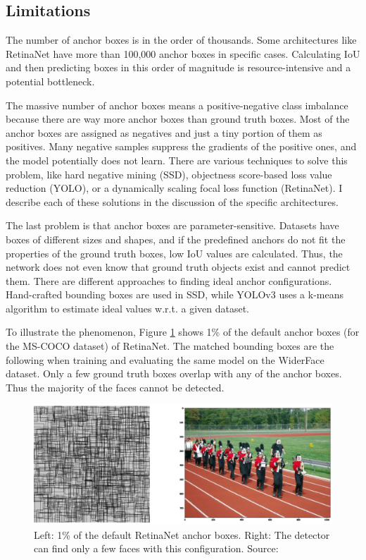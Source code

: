 \subsection{Limitations}

The number of anchor boxes is in the order of thousands. Some architectures like RetinaNet\cite{RetinaNet} have more than 100,000 anchor boxes in specific cases. Calculating IoU and then predicting boxes in this order of magnitude is resource-intensive and a potential bottleneck.

The massive number of anchor boxes means a positive-negative class imbalance because there are way more anchor boxes than ground truth boxes. Most of the anchor boxes are assigned as negatives and just a tiny portion of them as positives. Many negative samples suppress the gradients of the positive ones, and the model potentially does not learn. There are various techniques to solve this problem, like hard negative mining\cite{SSD} (SSD), objectness score-based loss value reduction\cite{YOLO} (YOLO), or a dynamically scaling focal loss function\cite{RetinaNet} (RetinaNet). I describe each of these solutions in the discussion of the specific architectures.

The last problem is that anchor boxes are parameter-sensitive. Datasets have boxes of different sizes and shapes, and if the predefined anchors do not fit the properties of the ground truth boxes, low IoU values are calculated. Thus, the network does not even know that ground truth objects exist and cannot predict them. There are different approaches to finding ideal anchor configurations. Hand-crafted bounding boxes are used in SSD, while YOLOv3\cite{YOLOv3} uses a k-means algorithm to estimate ideal values w.r.t. a given dataset.

To illustrate the phenomenon, Figure \ref{fig:anchor_bad_match} shows 1\% of the default anchor boxes (for the MS-COCO dataset) of RetinaNet. The matched bounding boxes are the following when training and evaluating the same model on the WiderFace dataset. Only a few ground truth boxes overlap with any of the anchor boxes. Thus the majority of the faces cannot be detected.

\begin{figure}[htb]
 \centerline{\includegraphics[width=1.0\columnwidth]{.//Figure/Detector/anchor_bad_match.png}}
 \caption{Left: 1\% of the default RetinaNet anchor boxes. Right: The detector can find only a few faces with this configuration. Source: \cite{AnchorBoxes}}
 \label{fig:anchor_bad_match}
\end{figure}

